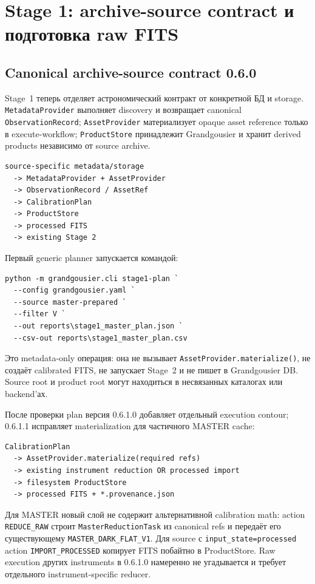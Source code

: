 \chapter{Stage 1: archive-source contract и подготовка raw FITS}


\section{Canonical archive-source contract 0.6.0}

Stage~1 теперь отделяет астрономический контракт от конкретной БД и storage. \texttt{MetadataProvider} выполняет discovery и возвращает canonical \texttt{ObservationRecord}; \texttt{AssetProvider} материализует opaque asset reference только в execute-workflow; \texttt{ProductStore} принадлежит Grandgousier и хранит derived products независимо от source archive.

\begin{verbatim}
source-specific metadata/storage
  -> MetadataProvider + AssetProvider
  -> ObservationRecord / AssetRef
  -> CalibrationPlan
  -> ProductStore
  -> processed FITS
  -> existing Stage 2
\end{verbatim}

Первый generic planner запускается командой:

\begin{lstlisting}
python -m grandgousier.cli stage1-plan `
  --config grandgousier.yaml `
  --source master-prepared `
  --filter V `
  --out reports\stage1_master_plan.json `
  --csv-out reports\stage1_master_plan.csv
\end{lstlisting}

Это metadata-only операция: она не вызывает \texttt{AssetProvider.materialize()}, не создаёт calibrated FITS, не запускает Stage~2 и не пишет в Grandgousier DB. Source root и product root могут находиться в несвязанных каталогах или backend'ах.

После проверки plan версия 0.6.1.0 добавляет отдельный execution contour; 0.6.1.1 исправляет materialization для частичного MASTER cache:

\begin{verbatim}
CalibrationPlan
  -> AssetProvider.materialize(required refs)
  -> existing instrument reduction OR processed import
  -> filesystem ProductStore
  -> processed FITS + *.provenance.json
\end{verbatim}

Для MASTER новый слой не содержит альтернативной calibration math: action \texttt{REDUCE\_RAW} строит \texttt{MasterReductionTask} из canonical refs и передаёт его существующему \texttt{MASTER\_DARK\_FLAT\_V1}. Для source с \texttt{input\_state=processed} action \texttt{IMPORT\_PROCESSED} копирует FITS побайтно в ProductStore. Raw execution других instruments в 0.6.1.0 намеренно не угадывается и требует отдельного instrument-specific reducer.

